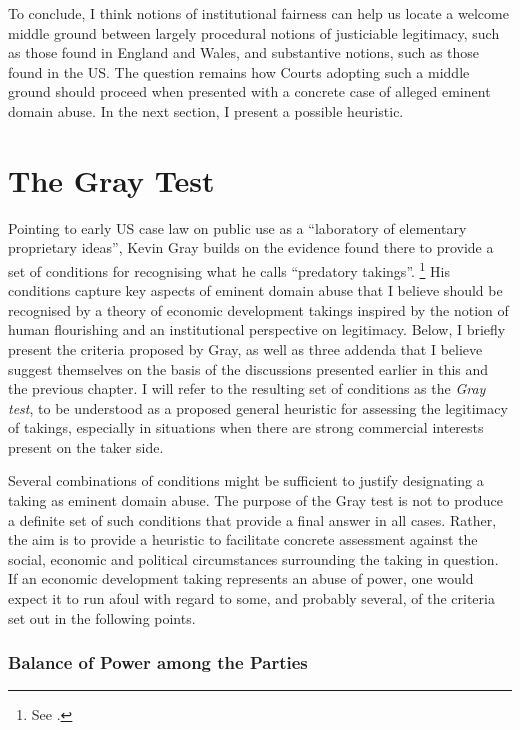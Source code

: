 To conclude, I think notions of institutional fairness can help us locate a welcome middle ground between largely procedural notions of justiciable legitimacy, such as those found in England and Wales, and substantive notions, such as those found in the US. The question remains how Courts adopting such a middle ground should proceed when presented with a concrete case of alleged eminent domain abuse. In the next section, I present a possible heuristic.

\section{The Gray Test}\label{sec:3:5}

Pointing to early US case law on public use as a ``laboratory of elementary proprietary ideas'', Kevin Gray builds on the evidence found there to provide a set of conditions for recognising what he calls ``predatory takings''. \footnote{See \cite[28-30]{gray11}.} His conditions capture key aspects of eminent domain abuse that I believe should be recognised by a theory of economic development takings inspired by the notion of human flourishing and an institutional perspective on legitimacy. Below, I briefly present the criteria proposed by Gray, as well as three addenda that I believe suggest themselves on the basis of the discussions presented earlier in this and the previous chapter. I will refer to the resulting set of conditions as the {\it Gray test}, to be understood as a proposed general heuristic for assessing the legitimacy of takings, especially in situations when there are strong commercial interests present on the taker side.

Several combinations of conditions might be sufficient to justify designating a taking as eminent domain abuse. The purpose of the Gray test is not to produce a definite set of such conditions that provide a final answer in all cases. Rather, the aim is to provide a heuristic to facilitate concrete assessment against the social, economic and political circumstances surrounding the taking in question. If an economic development taking represents an abuse of power, one would expect it to run afoul with regard to some, and probably several, of the criteria set out in the following points.

\subsubsection*{Balance of Power among the Parties}

